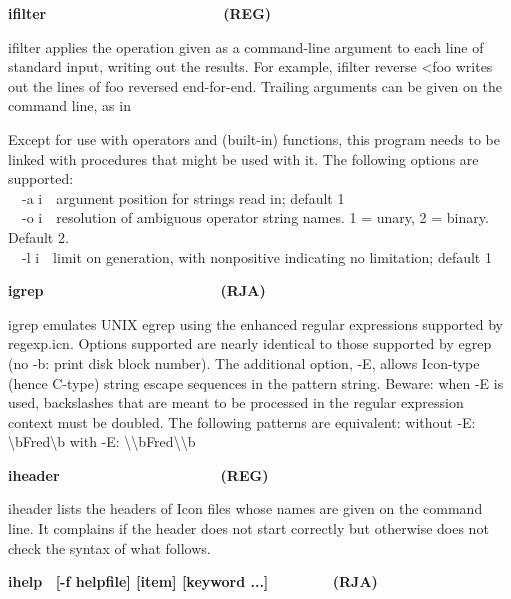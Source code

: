 {\sffamily\bfseries
ifilter\ \ \ \ \ \ \ \ \ \ \ \ \ \ \ \ \ \ \ \ \ \ (REG)}

\textsf{ifilter} applies the operation given as a command-line argument
to each line of standard input, writing out the results. For example,
\textsf{ifilter reverse {\textless}foo} writes out the lines of foo
reversed end-for-end. Trailing arguments can be given on the command
line, as in



Except for use with operators and (built-in) functions, this program
needs to be linked with procedures that might be used with it. The
following options are supported:\\
\textsf{\ \ {}-a i}\ \ argument position for strings read in; default
1\\
\ \ \textsf{{}-o i}\ \ resolution of ambiguous operator string names. 1
= unary, 2 = binary. Default 2.\\
\ \ \textsf{{}-l i}\ \ limit on generation, with nonpositive indicating
no limitation; default 1

{\sffamily\bfseries
igrep\ \ \ \ \ \ \ \ \ \ \ \ \ \ \ \ \ \ \ \ \ \ (RJA)}

\textsf{i}\textsf{grep} emulates UNIX egrep using the
enhanced regular expressions supported by \textsf{regexp.icn}. Options
supported are nearly identical to those supported by egrep (no -b:
print disk block number). The additional option, -E, allows Icon-type
(hence C-type) string escape sequences in the pattern string. Beware:
when -E is used, backslashes that are meant to be processed in the
regular expression context must be doubled. The following patterns are
equivalent: without -E:
{\textquotesingle}{\textbackslash}bFred{\textbackslash}b{\textquotesingle}
with -E:
{\textquotesingle}{\textbackslash}{\textbackslash}bFred{\textbackslash}{\textbackslash}b{\textquotesingle}


{\sffamily\bfseries
iheader\ \ \ \ \ \ \ \ \ \ \ \ \ \ \ \ \ \ \ \ (REG)}

\textsf{iheader} lists the headers of Icon files whose names are given
on the command line. It complains if the header does not start
correctly but otherwise does not check the syntax of what follows. 

{\sffamily\bfseries
ihelp \ \textrm{\textmd{[-f helpfile] [item] [keyword
...]\ \ \ \ \ \ \ \ }}(RJA)}

